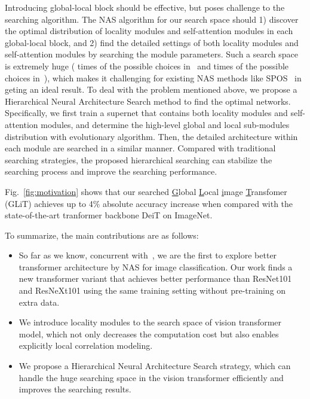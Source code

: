 \documentclass[10pt,twocolumn,letterpaper]{article}
\begin{document}
Introducing global-local block should be effective, but poses challenge to the searching algorithm.
The NAS algorithm for our search space should 1) discover the optimal distribution of locality modules and self-attention modules in each global-local block, and 2) find the detailed settings of both locality modules and self-attention modules by searching the module parameters. Such a search space is extremely huge ( times of the possible choices in~\cite{SPOS-ECCV20-Guo} and  times of the possible choices in~\cite{Darts-ICLR19-Liu}), which makes it challenging for existing NAS methods like SPOS~\cite{SPOS-ECCV20-Guo} in geting an ideal result. 
To deal with the problem mentioned above, we propose a Hierarchical Neural Architecture Search method to find the optimal networks. Specifically, we first train a supernet that contains both locality modules and self-attention modules, and determine the high-level global and local sub-modules distribution with evolutionary algorithm. Then, the detailed architecture within each module are searched in a similar manner. Compared with traditional searching strategies, the proposed hierarchical searching can stabilize the searching process and improve the searching performance. 

Fig.~\ref{fig:motivation} shows that our searched \underline{G}lobal \underline{L}ocal \underline{i}mage \underline{T}ransfomer (GLiT) achieves up to 4\% absolute accuracy increase when compared with the state-of-the-art tranformer backbone DeiT on ImageNet.



To summarize, the main contributions are as follows:
\begin{itemize}
	\setlength{\itemsep}{3pt}
	\setlength{\parsep}{3pt}
	\setlength{\parskip}{3pt}

	\item 
	\vspace{-6pt}
	So far as we know,
	concurrent with~\cite{autoformer}, we are the first to explore better transformer architecture by NAS for image classification. Our work finds a new transformer variant that achieves better performance than ResNet101 and ResNeXt101 using the same training setting without pre-training on extra data.
	\vspace{-6pt}
	\item We introduce locality modules to the search space of vision transformer model, which not only decreases the computation cost but also enables explicitly local correlation modeling.
	\vspace{-6pt}
	

	\item We propose a Hierarchical Neural Architecture Search strategy, which can handle the huge searching space in the vision transformer efficiently and improves the searching results.
\end{itemize}
\end{document}

